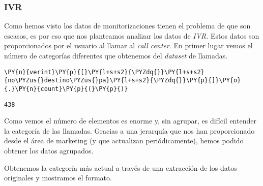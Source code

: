     \hypertarget{ivr}{%
\subsubsection{IVR}\label{ivr}}

    Como hemos visto los datos de monitorizaciones tienen el problema de que
son escasos, es por eso que nos planteamos analizar los datos de \textit{IVR}.
Estos datos son proporcionados por el usuario al llamar al \emph{call center}. En primer lugar vemos el número de categorías diferentes que obtenemos del \textit{dataset} de llamadas.

\vspace{0.5cm}

    \begin{tcolorbox}[breakable, size=fbox, boxrule=1pt, pad at break*=1mm,colback=cellbackground, colframe=cellborder]
\begin{Verbatim}[commandchars=\\\{\}]
\PY{n}{verint}\PY{p}{[}\PY{l+s+s2}{\PYZdq{}}\PY{l+s+s2}{no\PYZus{}destino\PYZus{}pa}\PY{l+s+s2}{\PYZdq{}}\PY{p}{]}\PY{o}{.}\PY{n}{count}\PY{p}{(}\PY{p}{)}
\end{Verbatim}
\end{tcolorbox}

            \begin{tcolorbox}[breakable, size=fbox, boxrule=.5pt, pad at break*=1mm, opacityfill=0]
\begin{Verbatim}[commandchars=\\\{\}]
438
\end{Verbatim}
\end{tcolorbox}
        
    Como vemos el número de elementos es enorme y, sin agrupar, es difícil entender la categoría de las llamadas. Gracias a una jerarquía que nos han proporcionado desde el área de marketing (y que actualizan periódicamente), hemos podido obtener los datos agrupados. 
    
    Obtenemos la categoría más actual a través de una extracción de los datos originales y mostramos el formato.
    
    \vspace{0.5cm}

